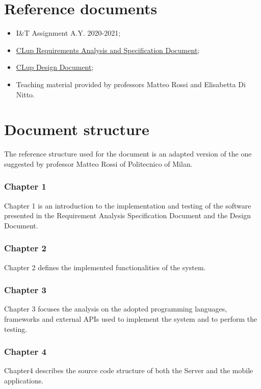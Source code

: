 \documentclass[a4paper,oneside,11pt]{book}
\begin{document}
    \section{Reference documents}
    \begin{itemize}
        \item I\&T Assignment A.Y. 2020-2021;
        \item \href{run:../DeliveryFolder/RASD2.pdf}{CLup Requirements Analysis and Specification Document};
        \item \href{run:../DeliveryFolder/RDD2.pdf}{CLup Design Document};
        \item Teaching material provided by professors Matteo Rossi and Elisabetta Di Nitto.
    \end{itemize}

    \newpage
    \section{Document structure}
    The reference structure used for the document is an adapted version of the one suggested by professor Matteo Rossi of Politecnico of Milan.

    \subsubsection{Chapter 1} 
    Chapter 1 is an introduction to the implementation and testing of the software presented in the Requirement Analysis Specification Document and the Design Document.
    
    \subsubsection{Chapter 2} 
    Chapter 2 defines the implemented functionalities of the system.

    \subsubsection{Chapter 3} 
    Chapter 3 focuses the analysis on the adopted programming languages, frameworks and external APIs used to implement the system and to perform the testing.

    \subsubsection{Chapter 4} 
    Chapter4 describes the source code structure of both the Server and the mobile applications.
\end{document}
